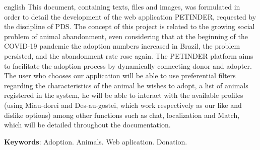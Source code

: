 \begin{resumo}[Abstract]
 \begin{otherlanguage*}{english}
   This document, containing texts, files and images, was formulated in order to detail the development of the web application PETINDER, requested by the discipline of \ac{PDS}. The concept of this project is related to the growing social problem of animal abandonment, even considering that at the beginning of the \gls{COVID-19} pandemic the adoption numbers increased in Brazil, the problem persisted, and the abandonment rate rose again. The PETINDER platform aims to facilitate the adoption process by dynamically connecting donor and adopter. The user who chooses our application will be able to use preferential filters regarding the characteristics of the animal he wishes to adopt, a list of animals registered in the system, he will be able to interact with the available profiles (using \gls{Miau-dorei} and \gls{Des-au-gostei}, which work respectively as our like and dislike options) among other functions such as chat, localization and \gls{Match}, which will be detailed throughout the documentation.


   \vspace{\onelineskip}

   \noindent 
   \textbf{Keywords}: Adoption. Animals. Web aplication. Donation.
 \end{otherlanguage*}
\end{resumo}